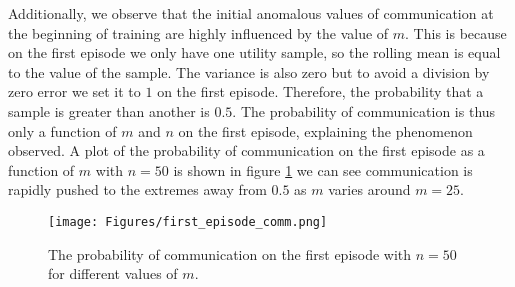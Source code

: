Additionally, we observe that the initial anomalous values of communication at the beginning of training are highly influenced by the value of $m$. This is because on the first episode we only have one utility sample, so the rolling mean is equal to the value of the sample. The variance is also zero but to avoid a division by zero error we set it to $1$ on the first episode. Therefore, the probability that a sample is greater than another is $0.5$. The probability of communication is thus only a function of $m$ and $n$ on the first episode, explaining the phenomenon observed. A plot of the probability of communication on the first episode as a function of $m$ with $n=50$ is shown in figure \ref{fig:EP1Comm} we can see communication is rapidly pushed to the extremes away from $0.5$ as $m$ varies around $m=25$.

\begin{figure}
    \centering
    \texttt{[image: Figures/first\_episode\_comm.png]}
    \caption{The probability of communication on the first episode with $n=50$ for different values of $m$.}
    \label{fig:EP1Comm}
\end{figure}

